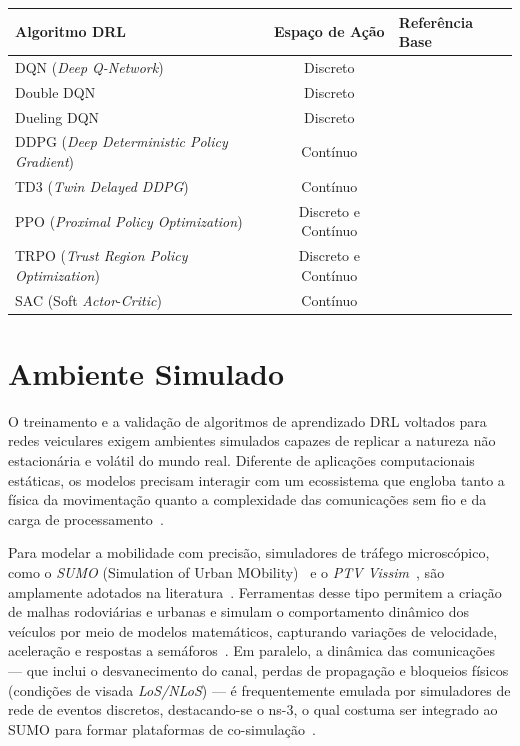 \begin{table}[ht!]
    \centering
    \renewcommand{\arraystretch}{1.3}
    \setlength{\tabcolsep}{2pt}
    \begin{tabularx}{\textwidth}{|>{\raggedright\arraybackslash}X|c|>{\raggedright\arraybackslash}X|}
        \hline
        Algoritmo \gls{DRL} & Espaço de Ação & Referência Base \\ \hline
        \gls{DQN} (\textit{Deep Q-Network}) & Discreto &~\cite{uddin2025, farimani2024} \\ \hline
        Double \gls{DQN} & Discreto &~\cite{uddin2025} \\ \hline
        Dueling \gls{DQN} & Discreto &~\cite{uddin2025} \\ \hline
        \gls{DDPG} (\textit{Deep Deterministic Policy Gradient}) & Contínuo &~\cite{uddin2025, farimani2024} \\ \hline
        \gls{TD3} (\textit{Twin Delayed DDPG}) & Contínuo &~\cite{uddin2025} \\ \hline
        \gls{PPO} (\textit{Proximal Policy Optimization}) & Discreto e Contínuo &~\cite{uddin2025} \\ \hline
        TRPO (\textit{Trust Region Policy Optimization}) & Discreto e Contínuo &~\cite{uddin2025} \\ \hline
        \gls{SAC} (Soft \textit{Actor}-\textit{Critic}) & Contínuo &~\cite{uddin2025, farimani2024} \\ \hline
    \end{tabularx}
\end{table}

\section*{Ambiente Simulado}
O treinamento e a validação de algoritmos de aprendizado \gls{DRL} voltados para redes veiculares exigem ambientes simulados capazes de replicar a natureza não estacionária e volátil do mundo real. Diferente de aplicações computacionais estáticas, os modelos precisam interagir com um ecossistema que engloba tanto a física da movimentação quanto a complexidade das comunicações sem fio e da carga de processamento~\cite{uddin2025}.

Para modelar a mobilidade com precisão, simuladores de tráfego microscópico, como o \textit{SUMO} (Simulation of Urban MObility)~\cite{lopez2018microscopic} e o \textit{PTV Vissim}~\cite{ptv2020vissim}, são amplamente adotados na literatura~\cite{souza2021, kumar2023}. Ferramentas desse tipo permitem a criação de malhas rodoviárias e urbanas e simulam o comportamento dinâmico dos veículos por meio de modelos matemáticos, capturando variações de velocidade, aceleração e respostas a semáforos~\cite{li2025}. Em paralelo, a dinâmica das comunicações --- que inclui o desvanecimento do canal, perdas de propagação e bloqueios físicos (condições de visada \textit{LoS/NLoS}) --- é frequentemente emulada por simuladores de rede de eventos discretos, destacando-se o ns-3, o qual costuma ser integrado ao SUMO para formar plataformas de co-simulação~\cite{souza2021, uddin2025}.

